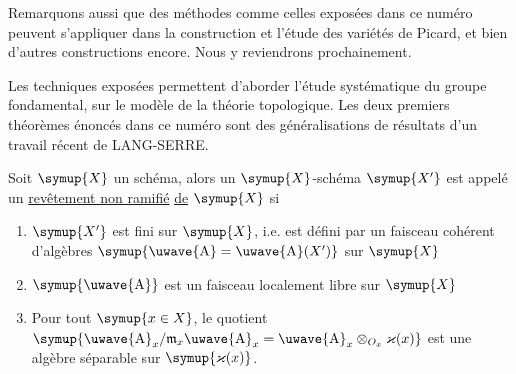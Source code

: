 Remarquons aussi que des méthodes comme celles exposées dans ce numéro peuvent
s'appliquer dans la construction et l'étude des variétés de Picard, et bien
d'autres constructions encore. Nous y reviendrons prochainement.


Les techniques exposées permettent d'aborder l'étude systématique du groupe
fondamental, sur le modèle de la théorie topologique. Les deux premiers
théorèmes énoncés dans ce numéro sont des généralisations de résultats d'un
travail récent de LANG-SERRE.

Soit $\symup{X}$ un schéma, alors un $\symup{X}$-schéma $\symup{X'}$ est appelé un \uline{revêtement non
ramifié}
\uline{de} $\symup{X}$ si
\begin{enumerate}
  \item[\textnormal{i.}] $\symup{X'}$ est fini sur $\symup{X}$, i.e. est défini par un faisceau
    cohérent d'algèbres $\symup{\text{\uwave{A}}=\text{\uwave{A}}(X')}$ sur $\symup{X}$
  \item[\textnormal{ii.}] $\symup{\text{\uwave{A}}}$ est un faisceau localement libre sur $\symup{X}$
  \item[\textnormal{iii.}] Pour tout $\symup{x\in X}$, le quotient
    $\symup{\text{\uwave{A}}_x/\mathfrak m_x\text{\uwave{A}}_x =\text{\uwave{A}}_x\otimes_{O_x}\varkappa(x)}$
    est une algèbre séparable sur $\symup{\varkappa(x)}$.
\end{enumerate}

